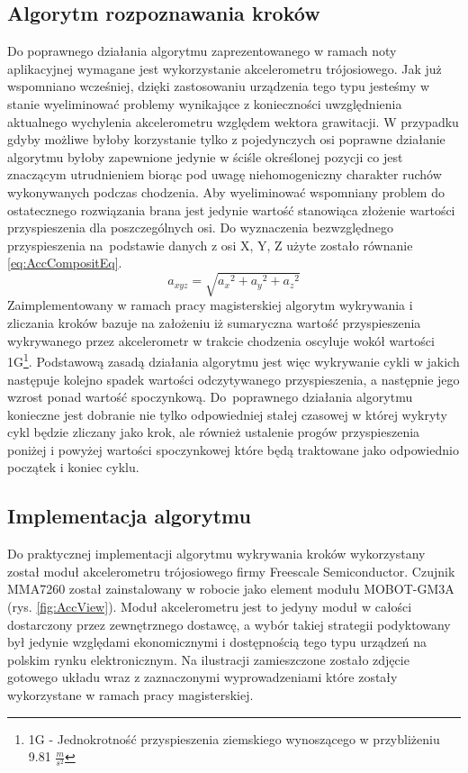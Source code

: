 \subsection{Algorytm rozpoznawania kroków}
Do poprawnego działania algorytmu zaprezentowanego w ramach noty
aplikacyjnej\cite{Pedometer-haam326b} wymagane jest wykorzystanie akcelerometru
trójosiowego. Jak już wspomniano wcześniej, dzięki zastosowaniu urządzenia tego
typu jesteśmy w stanie wyeliminować problemy wynikające z konieczności 
uwzględnienia aktualnego wychylenia akcelerometru względem wektora grawitacji. 
W przypadku gdyby możliwe byłoby korzystanie tylko z pojedynczych osi poprawne
działanie algorytmu byłoby zapewnione jedynie w ściśle określonej pozycji co
jest znaczącym utrudnieniem biorąc pod uwagę niehomogeniczny charakter ruchów
wykonywanych podczas chodzenia. Aby wyeliminować wspomniany problem do
ostatecznego rozwiązania brana jest jedynie wartość stanowiąca złożenie wartości
przyspieszenia dla poszczególnych osi. Do wyznaczenia bezwzględnego
przyspieszenia na~podstawie danych z osi X, Y, Z użyte zostało równanie
\ref{eq:AccCompositEq}.
\begin{equation}
a_{xyz} = \sqrt{{a_x}^2 + {a_y}^2 + {a_z}^2}
\label{eq:AccCompositEq}
\end{equation}
Zaimplementowany w ramach pracy magisterskiej algorytm wykrywania i zliczania
kroków bazuje na założeniu iż sumaryczna wartość przyspieszenia wykrywanego
przez akcelerometr w trakcie chodzenia oscyluje wokół wartości 1G\footnote{1G
- Jednokrotność przyspieszenia ziemskiego wynoszącego w przybliżeniu 9.81
$\frac{m}{s^2}$}. Podstawową zasadą działania algorytmu jest więc wykrywanie
cykli w jakich następuje kolejno spadek wartości odczytywanego przyspieszenia, a
następnie jego wzrost ponad wartość spoczynkową. Do~poprawnego działania
algorytmu konieczne jest dobranie nie tylko odpowiedniej stałej czasowej w
której wykryty cykl będzie zliczany jako krok, ale również ustalenie progów
przyspieszenia poniżej i powyżej wartości spoczynkowej które będą traktowane
jako odpowiednio początek i koniec cyklu.
\subsection{Implementacja algorytmu}
Do praktycznej implementacji algorytmu wykrywania kroków wykorzystany został
moduł akcelerometru trójosiowego firmy Freescale Semiconductor. Czujnik 
MMA7260\cite{MMA7260DataSheet} został zainstalowany w robocie jako element
modułu MOBOT-GM3A (rys. \ref{fig:AccView}). Moduł akcelerometru jest to jedyny moduł
w całości dostarczony przez zewnętrznego dostawcę, a wybór takiej strategii podyktowany
był jedynie względami ekonomicznymi i dostępnością tego typu urządzeń na polskim
rynku elektronicznym. Na ilustracji zamieszczone zostało zdjęcie gotowego układu
wraz z zaznaczonymi wyprowadzeniami które zostały wykorzystane w ramach pracy
magisterskiej.

